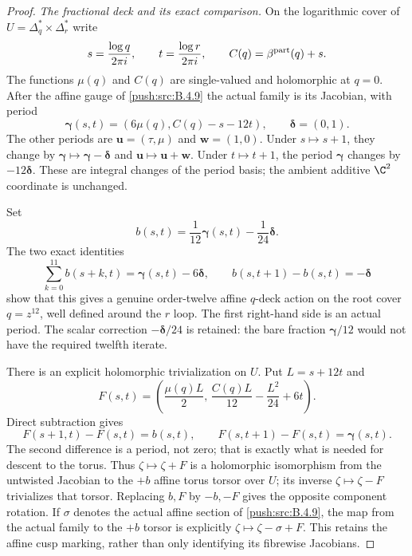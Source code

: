 \begin{proof}
\emph{The fractional deck and its exact comparison.}
On the logarithmic cover of
$U=\Delta_q^*\times\Delta_r^*$ write
\[
 s=\frac{\log q}{2\pi i},\qquad
 t=\frac{\log r}{2\pi i},\qquad
 C(q)=\beta^{\rm part}(q)+s.
\]
The functions $\mu(q)$ and $C(q)$ are single-valued
and holomorphic at $q=0$. After the affine gauge of
\ref{push:src:B.4.9} the actual family is its Jacobian, with period
\[
 \boldsymbol\gamma(s,t)
       =(6\mu(q),C(q)-s-12t),\qquad
 \boldsymbol\delta=(0,1).
 \tag{B.4.18.1}
\]
The other periods are
$\mathbf u=(\tau,\mu)$ and $\mathbf w=(1,0)$.
Under $s\mapsto s+1$, they change by
$\boldsymbol\gamma\mapsto\boldsymbol\gamma-
\boldsymbol\delta$ and $\mathbf u\mapsto\mathbf u+\mathbf w$.
Under $t\mapsto t+1$, the period $\boldsymbol\gamma$
changes by $-12\boldsymbol\delta$.
These are integral changes of the period basis; the
ambient additive $\C^2$ coordinate is unchanged.

Set
\[
 b(s,t)=\frac1{12}\boldsymbol\gamma(s,t)
                         -\frac1{24}\boldsymbol\delta.
\]
The two exact identities
\[
 \sum_{k=0}^{11}b(s+k,t)
       =\boldsymbol\gamma(s,t)-6\boldsymbol\delta,
 \qquad
 b(s,t+1)-b(s,t)=-\boldsymbol\delta
 \tag{B.4.18.2}
\]
show that this gives a genuine order-twelve affine
$q$-deck action on the root cover $q=z^{12}$,
well defined around the $r$ loop. The first right-hand
side is an actual period. The scalar correction
$-\boldsymbol\delta/24$ is retained: the bare fraction
$\boldsymbol\gamma/12$ would not have the required
twelfth iterate.

There is an explicit holomorphic trivialization on $U$.
Put $L=s+12t$ and
\[
 F(s,t)=
 \left(\frac{\mu(q)L}{2},\,
       \frac{C(q)L}{12}-\frac{L^2}{24}+6t\right).
 \tag{B.4.18.3}
\]
Direct subtraction gives
\[
 F(s+1,t)-F(s,t)=b(s,t),\qquad
 F(s,t+1)-F(s,t)=\boldsymbol\gamma(s,t).
 \tag{B.4.18.4}
\]
The second difference is a period, not zero; that is
exactly what is needed for descent to the torus.
Thus $\zeta\mapsto\zeta+F$ is a holomorphic
isomorphism from the untwisted Jacobian to the
$+b$ affine torus torsor over $U$; its inverse
$\zeta\mapsto\zeta-F$ trivializes that torsor.
Replacing $b,F$ by $-b,-F$ gives the opposite
component rotation. If $\sigma$ denotes the actual
affine section of \ref{push:src:B.4.9}, the map from the actual
family to the $+b$ torsor is explicitly
$\zeta\mapsto\zeta-\sigma+F$.
This retains the affine cusp marking, rather
than only identifying its fibrewise Jacobians.


\end{proof}
